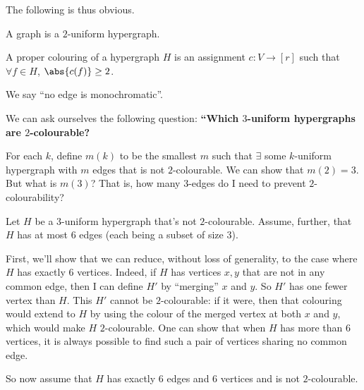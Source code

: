 The following is thus obvious.

\begin{boxproposition}
    A graph is a $2$-uniform hypergraph.
\end{boxproposition}

\begin{boxdefinition}
A proper colouring of a hypergraph $H$ is an assignment $c : V \to [r]$ such that $\forall f \in H$, $\abs{c(f)} \geq 2$.
\end{boxdefinition}

We say ``no edge is monochromatic''.

We can ask ourselves the following question: \textbf{``Which $3$-uniform hypergraphs are $2$-colourable?}

For each $k$, define $m(k)$ to be the smallest $m$ such that $\exists$ some $k$-uniform hypergraph with $m$ edges that is not $2$-colourable. We can show that $m(2) = 3$. But what is $m(3)$? That is, how many $3$-edges do I need to prevent $2$-colourability?

Let $H$ be a $3$-uniform hypergraph that's not $2$-colourable. Assume, further, that $H$ has at most $6$ edges (each being a subset of size $3$).

First, we'll show that we can reduce, without loss of generality, to the case where $H$ has exactly $6$ vertices. Indeed, if $H$ has vertices $x, y$ that are not in any common edge, then I can define $H'$ by ``merging'' $x$ and $y$. So $H'$ has one fewer vertex than $H$. This $H'$ cannot be $2$-colourable: if it were, then that colouring would extend to $H$ by using the colour of the merged vertex at both $x$ and $y$, which would make $H$ $2$-colourable. One can show that when $H$ has more than $6$ vertices, it is always possible to find such a pair of vertices sharing no common edge.


So now assume that $H$ has exactly $6$ edges and $6$ vertices and is not $2$-colourable. 